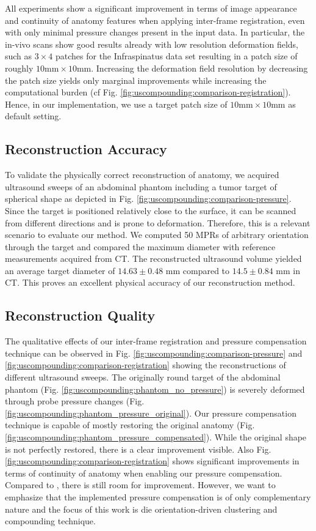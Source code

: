 All experiments show a significant improvement in terms of image appearance and continuity of anatomy features when applying inter-frame registration, even with only minimal pressure changes present in the input data.
In particular, the in-vivo scans show good results already with low resolution deformation fields, such as $3 \times 4$ patches for the Infraspinatus data set resulting in a patch size of roughly $10\text{mm} \times 10\text{mm}$.
Increasing the deformation field resolution by decreasing the patch size yields only marginal improvements while increasing the computational burden (cf Fig. \ref{fig:uscompounding:comparison-registration}).
Hence, in our implementation, we use a target patch size of $10\text{mm} \times 10\text{mm}$ as default setting.



\subsection{Reconstruction Accuracy}
To validate the physically correct reconstruction of anatomy, we acquired ultrasound sweeps of an abdominal phantom including a tumor target of spherical shape as depicted in Fig. \ref{fig:uscompounding:comparison-pressure}.
Since the target is positioned relatively close to the surface, it can be scanned from different directions and is prone to deformation.
Therefore, this is a relevant scenario to evaluate our method.
We computed 50 MPRs of arbitrary orientation through the target and compared the maximum diameter with reference measurements acquired from CT. 
The reconstructed ultrasound volume yielded an average target diameter of $14.63 \pm 0.48$ mm  compared to $14.5 \pm 0.84$ mm in CT.
This proves an excellent physical accuracy of our reconstruction method.



\subsection{Reconstruction Quality}
The qualitative effects of our inter-frame registration and pressure compensation technique can be observed in Fig. \ref{fig:uscompounding:comparison-pressure} and \ref{fig:uscompounding:comparison-registration} showing the reconstructions of different ultrasound sweeps. 
The originally round target of the abdominal phantom (Fig. \ref{fig:uscompounding:phantom_no_pressure}) is severely deformed through probe pressure changes (Fig. \ref{fig:uscompounding:phantom_pressure_original}).
Our pressure compensation technique is capable of mostly restoring the original anatomy (Fig. \ref{fig:uscompounding:phantom_pressure_compensated}).
While the original shape is not perfectly restored, there is a clear improvement visible.
Also Fig. \ref{fig:uscompounding:comparison-registration} shows significant improvements in terms of continuity of anatomy when enabling our pressure compensation.
Compared to \cite{Treece02}, there is still room for improvement. 
However, we want to emphasize that the implemented pressure compensation is of only complementary nature and the focus of this work is die orientation-driven clustering and compounding technique.

